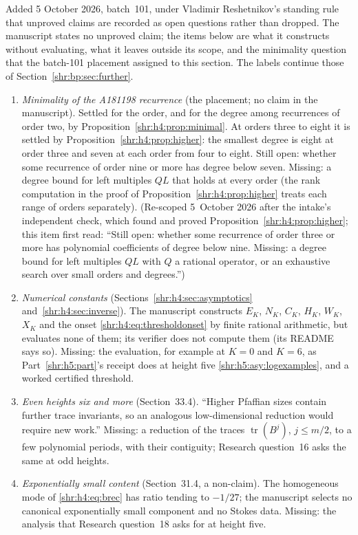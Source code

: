 \documentclass[11pt,letterpaper]{article}
\numberwithin{equation}{section}
\theoremstyle{definition}
\newcommand{\1}{\mathbf 1}
\DeclareMathOperator{\tr}{tr}
\begin{document}
Added 5 October 2026, batch~101, under Vladimir Reshetnikov's standing rule
that unproved claims are recorded as open questions rather than dropped.
The manuscript states no unproved claim; the items below are what it
constructs without evaluating, what it leaves outside its scope, and the
minimality question that the batch-101 placement assigned to this section.
The labels continue those of Section~\ref{shr:bp:sec:further}.
\begin{enumerate}[label=(F\arabic*),leftmargin=*,start=5]
\item \emph{Minimality of the A181198 recurrence} (the placement; no claim
in the manuscript). Settled for the order, and for the degree among
recurrences of order two, by Proposition~\ref{shr:h4:prop:minimal}.
At orders three to eight it is settled by
Proposition~\ref{shr:h4:prop:higher}: the smallest degree is eight at
order three and seven at each order from four to eight. Still open:
whether some recurrence of order nine or more has degree below seven.
Missing: a degree bound for left multiples $QL$ that holds at every order
(the rank computation in the proof of
Proposition~\ref{shr:h4:prop:higher} treats each range of orders
separately). (Re-scoped 5~October 2026 after the intake's independent
check, which found and proved Proposition~\ref{shr:h4:prop:higher}; this
item first read: ``Still open: whether some recurrence of order three or
more has polynomial coefficients of degree below nine. Missing: a degree
bound for left multiples $QL$ with $Q$ a rational operator, or an
exhaustive search over small orders and degrees.'')
\item \emph{Numerical constants} (Sections~\ref{shr:h4:sec:asymptotics}
and~\ref{shr:h4:sec:inverse}). The manuscript constructs $E_K$, $N_K$,
$C_K$, $H_K$, $W_K$, $X_K$ and the onset \eqref{shr:h4:eq:thresholdonset}
by finite rational arithmetic, but evaluates none of them; its verifier
does not compute them (its README says so). Missing: the evaluation, for
example at $K=0$ and $K=6$, as Part~\ref{shr:h5:part}'s receipt does at
height five \eqref{shr:h5:asy:logexamples}, and a worked certified
threshold.
\item \emph{Even heights six and more} (Section~33.4). ``Higher Pfaffian
sizes contain further trace invariants, so an analogous low-dimensional
reduction would require new work.'' Missing: a reduction of the traces
$\tr(B^j)$, $j\le m/2$, to a few polynomial periods, with their
contiguity; Research question~16 asks the same at odd heights.
\item \emph{Exponentially small content} (Section~31.4, a non-claim). The
homogeneous mode of \eqref{shr:h4:eq:brec} has ratio tending to $-1/27$;
the manuscript selects no canonical exponentially small component and no
Stokes data. Missing: the analysis that Research question~18 asks for at
height five.
\end{enumerate}
\end{document}
